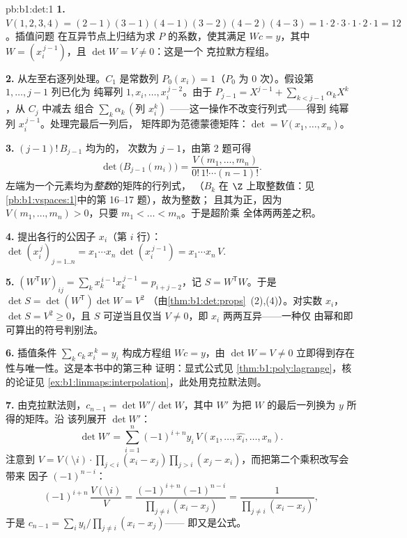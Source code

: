 \begin{solution}{pb:b1:det:1}
\textbf{1.} $V(1,2,3,4) = (2-1)(3-1)(4-1)(3-2)(4-2)(4-3) = 1
\cdot 2\cdot 3\cdot 1\cdot 2\cdot 1 = 12$。插值问题
在互异节点上归结为求 $P$ 的系数，使其满足 $W c =
y$，其中 $W = (x_i^{\,j-1})$，且 $\det W = V \neq 0$：这是一个
克拉默方程组。

\textbf{2.} 从左至右逐列处理。$C_1$
是常数列 $P_0(x_i) = 1$（$P_0$ 为
$0$ 次）。假设第 $1, \dots, j-1$ 列已化为
纯幂列 $1, x_i, \dots, x_i^{\,j-2}$。由于 $P_{j-1}
= X^{j-1} + \sum_{k < j-1}\alpha_k X^k$，从 $C_j$ 中减去
组合 $\sum_k \alpha_k\,(\text{列 } x_i^k)$
——这一操作不改变行列式——得到
纯幂列 $x_i^{\,j-1}$。处理完最后一列后，
矩阵即为范德蒙德矩阵：$\det = V(x_1, \dots, x_n)$。

\textbf{3.}  $(j-1)!\,B_{j-1}$ 均为的，
次数为 $j - 1$，由第 2 题可得
\[
\det\bigl(B_{j-1}(m_i)\bigr)
= \frac{V(m_1, \dots, m_n)}{0!\,1!\cdots(n-1)!} .
\]
左端为一个元素均为\emph{整数}的矩阵的行列式，
（$B_k$ 在 $\Z$ 上取整数值：见
\cref{pb:b1:vspaces:1}中的第 16--17 题），故为整数；
且其为正，因为 $V(m_1, \dots, m_n) > 0$，只要 $m_1 <
\dots < m_n$。于是超阶乘
全体两两差之积。

\textbf{4.} 提出各行的公因子 $x_i$（第 $i$ 行）：
$\det(x_i^{\,j})_{j = 1..n} = x_1\cdots x_n\,
\det(x_i^{\,j-1}) = x_1\cdots x_n\,V$.

\textbf{5.} $(W^{\mathsf T}W)_{ij} = \sum_k x_k^{\,i-1}
x_k^{\,j-1} = p_{i+j-2}$，记 $S = W^{\mathsf T}W$。于是 $\det S =
\det(W^{\mathsf T})\det W = V^2$
（由\cref{thm:b1:det:props}~(2),(4)）。对实数 $x_i$，$\det S = V^2
\geq 0$，且 $S$ 可逆当且仅当 $V \neq 0$，即
$x_i$ 两两互异——一种仅
由幂和即可算出的符号判别法。

\textbf{6.} 插值条件 $\sum_{k}
c_k\,x_i^{\,k} = y_i$ 构成方程组 $Wc = y$，由 $\det W = V \neq
0$ 立即得到存在性与唯一性。这是本书中的第三种
证明：显式公式见
\cref{thm:b1:poly:lagrange}，核的论证见
\cref{ex:b1:linmaps:interpolation}，此处用克拉默法则。

\textbf{7.} 由克拉默法则，$c_{n-1} = \det W'/\det W$，其中 $W'$ 为把 $W$
的最后一列换为 $y$ 所得的矩阵。沿
该列展开 $\det W'$：
\[
\det W' = \sum_{i=1}^n (-1)^{i+n} y_i\,V(x_1, \dots, \widehat{x_i},
\dots, x_n) .
\]
注意到 $V = V(\setminus i)\cdot\prod_{j<i}(x_i - x_j)\prod_{j>i}
(x_j - x_i)$，而把第二个乘积改写会带来
因子 $(-1)^{n-i}$：
\[
(-1)^{i+n}\,\frac{V(\setminus i)}{V}
= \frac{(-1)^{i+n}(-1)^{n-i}}{\prod_{j\neq i}(x_i - x_j)}
= \frac{1}{\prod_{j\neq i}(x_i - x_j)} ,
\]
于是 $c_{n-1} = \sum_i y_i/\prod_{j \neq i}(x_i - x_j)$——
即又是公式。


\end{solution}
